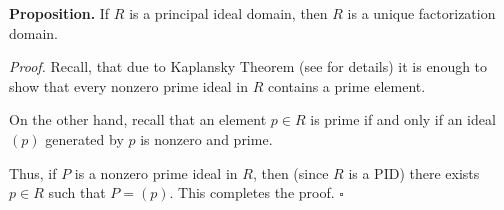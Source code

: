 \documentclass[12pt]{article}
\begin{document}
\textbf{Proposition.} If $R$ is a principal ideal domain, then $R$ is a unique factorization domain.

\textit{Proof.} Recall, that due to Kaplansky Theorem (see  for details) it is enough to show that every nonzero prime ideal in $R$ contains a prime element.

On the other hand, recall that an element $p\in R$ is prime if and only if an ideal $(p)$ generated by $p$ is nonzero and prime.

Thus, if $P$ is a nonzero prime ideal in $R$, then (since $R$ is a PID) there exists $p\in R$ such that $P=(p)$. This completes the proof. $\square$
\end{document}
